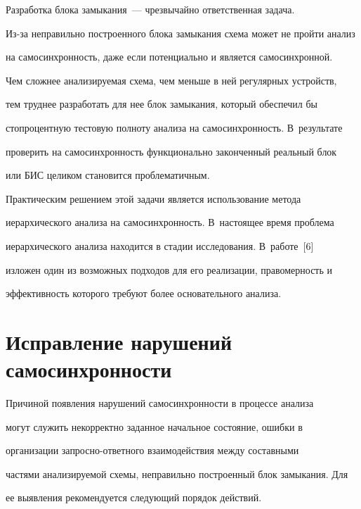       Разработка блока замыкания~--- чрезвычайно ответственная задача. 


      Из-за неправильно построенного блока замыкания схема может не пройти анализ 


на самосинхронность, даже если потенциально и является самосинхронной. 


Чем сложнее анализируемая схема, чем меньше в ней регулярных устройств, 


тем труднее разработать для нее блок замыкания, который обеспечил бы 


стопроцентную тестовую полноту анализа на самосинхронность. В~результате 


проверить на самосинхронность функционально законченный реальный блок 


или БИС целиком становится проблематичным.


      


      Практическим решением этой задачи является использование метода 


иерархического анализа на самосинхронность. В~настоящее время проблема 


иерархического анализа находится в стадии исследования. В~работе~[6] 


изложен один из возможных подходов для его реализации, правомерность и 


эффективность которого требуют более основательного анализа.


      


      \section{Исправление нарушений самосинхронности}


      


      Причиной появления нарушений самосинхронности в процессе анализа 


могут служить некорректно заданное начальное состояние, ошибки в 


организации за\-прос\-но-от\-вет\-но\-го взаимодействия между составными 


частями анализируемой схемы, неправильно построенный блок замыкания. Для 


ее выявления рекомендуется следующий порядок действий.


